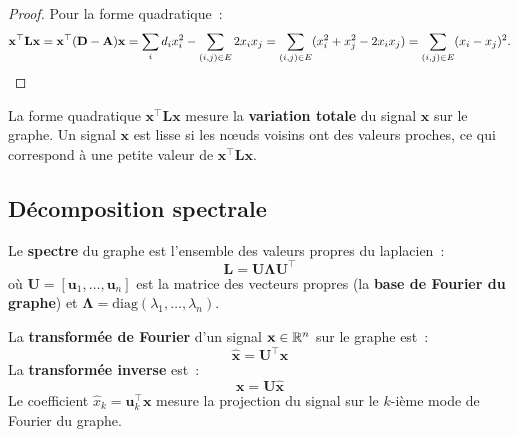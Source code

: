 \begin{proof}
Pour la forme quadratique~:
\[
    \mathbf{x}^\top \mathbf{L} \mathbf{x} = \mathbf{x}^\top (\mathbf{D} - \mathbf{A})\mathbf{x}
    = \sum_i d_i x_i^2 - \sum_{(i,j) \in E} 2x_i x_j
    = \sum_{(i,j) \in E} (x_i^2 + x_j^2 - 2x_i x_j)
    = \sum_{(i,j) \in E} (x_i - x_j)^2. \qedhere
\]
\end{proof}

\begin{intuition}[title=\textbf{Le laplacien comme op\'erateur de lissage}]
La forme quadratique $\mathbf{x}^\top \mathbf{L} \mathbf{x}$ mesure la
\textbf{variation totale} du signal $\mathbf{x}$ sur le graphe. Un signal
$\mathbf{x}$ est lisse si les n\oe uds voisins ont des valeurs proches, ce
qui correspond \`a une petite valeur de $\mathbf{x}^\top \mathbf{L} \mathbf{x}$.
\end{intuition}

\subsection{D\'ecomposition spectrale}

\begin{definition}
Le \textbf{spectre} du graphe est l'ensemble des valeurs propres du laplacien~:
\[
    \mathbf{L} = \mathbf{U} \boldsymbol{\Lambda} \mathbf{U}^\top
\]
o\`u $\mathbf{U} = [\mathbf{u}_1, \ldots, \mathbf{u}_n]$ est la matrice
des vecteurs propres (la \textbf{base de Fourier du graphe}) et
$\boldsymbol{\Lambda} = \mathrm{diag}(\lambda_1, \ldots, \lambda_n)$.
\end{definition}

\begin{formules}[title=\textbf{Transform\'ee de Fourier sur graphe}]
La \textbf{transform\'ee de Fourier} d'un signal $\mathbf{x} \in \mathbb{R}^n$
sur le graphe est~:
\[
    \hat{\mathbf{x}} = \mathbf{U}^\top \mathbf{x}
\]
La \textbf{transform\'ee inverse} est~:
\[
    \mathbf{x} = \mathbf{U} \hat{\mathbf{x}}
\]
Le coefficient $\hat{x}_k = \mathbf{u}_k^\top \mathbf{x}$ mesure la
projection du signal sur le $k$-i\`eme mode de Fourier du graphe.
\end{formules}

